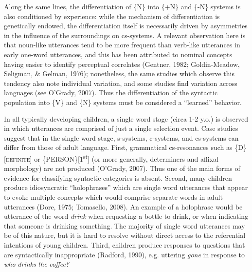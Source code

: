 Along the same lines, the differentiation of \{N\} into \{+N\} and \{-N\} systems is also conditioned by experience: while the mechanism of differentiation is genetically endowed, the differentiation itself is necessarily driven by asymmetries in the influence of the surroundings on cs-systems. A relevant observation here is that noun-like utterances tend to be more frequent than verb-like utterances in early one-word utterances, and this has been attributed to nominal concepts having easier to identify perceptual correlates (Gentner, 1982; Goldin-Meadow, Seligman, \& Gelman, 1976); nonetheless, the same studies which observe this tendency also note individual variation, and some studies find variation across languages (see O’Grady, 2007). Thus the differentiation of the syntactic population into \{V\} and \{N\} systems must be considered a “learned” behavior.

In all typically developing children, a single word stage (circa 1-2 y.o.) is observed in which utterances are comprised of just a single selection event. Case studies suggest that in the single word stage, s-systems, c-systems, and cs-systems can differ from those of adult language. First, grammatical cs-resonances such as \{D\}[\textsc{definite}] or \{PERSON\}[1\textsuperscript{st}] (or more generally, determiners and affixal morphology) are not produced (O’Grady, 2007). Thus one of the main forms of evidence for classifying syntactic categories is absent. Second, many children produce idiosyncratic “holophrases” which are single word utterances that appear to evoke multiple concepts which would comprise separate words in adult utterances (Dore, 1975; Tomasello, 2008). An example of a holophrase would be utterance of the word \textit{drink} when requesting a bottle to drink, or when indicating that someone is drinking something. The majority of single word utterances may be of this nature, but it is hard to resolve without direct access to the referential intentions of young children. Third, children produce responses to questions that are syntactically inappropriate (Radford, 1990), e.g. uttering \textit{gone} in response to \textit{who} \textit{drinks} \textit{the} \textit{coffee?} 


